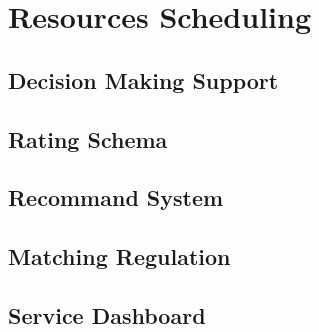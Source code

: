 \section{Resources Scheduling} %
\label{sec:model}

\subsection{Decision Making Support} %
\label{sub:decision_making_support}


\subsection{Rating Schema} %
\label{sub:rating_schema}


\subsection{Recommand System} %
\label{sub:recommand_system}


\subsection{Matching Regulation} %
\label{sub:matching_regulation}


\subsection{Service Dashboard} %
\label{sub:service_dashboard}


